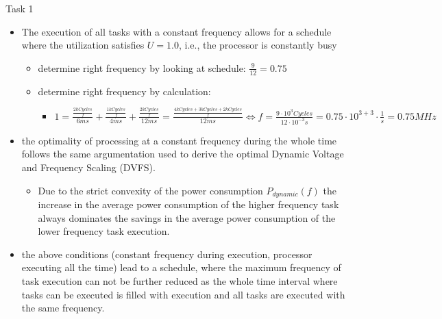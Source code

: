 \begin{frame}[allowframebreaks]{Task 1}{}
\begin{solutionnoinc}
    \begin{itemize}
      \item The execution of all tasks with a constant frequency allows for a schedule where the utilization satisfies $U = 1.0$, i.e., the processor is constantly busy
        \begin{itemize}
          \item determine right frequency by looking at schedule: $\frac{9}{12} = 0.75$
          \item determine right frequency by calculation:
            \begin{itemize}
              \item $1 = \frac{\frac{2 kCycles}{f}}{6ms} + \frac{\frac{1 kCycles}{f}}{4ms}  + \frac{\frac{2 kCycles}{f}}{12ms} = \frac{\frac{4 kCycles + 3 kCycles + 2 kCycles}{f}}{12ms} \Leftrightarrow f = \frac{9 \cdot 10^3 Cycles}{12 \cdot 10^{-3} s} = 0.75 \cdot 10^{3 + 3} \cdot \frac{1}{s}  = 0.75MHz$
            \end{itemize}
        \end{itemize}
      \item the optimality of processing at a constant frequency during the whole time follows the same argumentation used to derive the optimal Dynamic Voltage and Frequency Scaling (DVFS).
      \begin{itemize}
        \item Due to the strict convexity of the power consumption $P_{dynamic}(f)$ the increase in the average power consumption of the higher frequency task always dominates the savings in the average power consumption of the lower frequency task execution.
      \end{itemize}
    \end{itemize}
  \end{solutionnoinc}
  \begin{solutionnoinc}
    \small
    \begin{itemize}
      \item the above conditions (constant frequency during execution, processor executing all the time) lead to a schedule, where the maximum frequency of task execution can not be further reduced as the whole time interval where tasks can be executed is filled with execution and all tasks are executed with the same frequency.
    \end{itemize}
  \end{solutionnoinc}
  \if{}
\end{frame}
